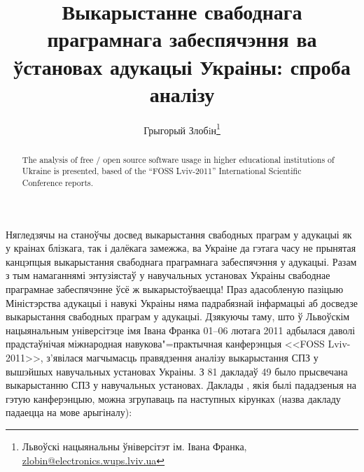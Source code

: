 \documentclass[10pt, a5paper]{article}
\begin{document}
\renewcommand{\figurename}{Рыс.} %
\renewcommand{\abstractname}{Анатацыя}
\renewcommand{\refname}{Літаратура}

\title{Выкарыстанне свабоднага праграмнага забеспячэння ва ўстановах адукацыі Украіны: спроба аналізу}

\author{Грыгорый Злобiн\footnote{Львоўскі нацыянальны ўніверсітэт ім. Івана Франка, \url{zlobin@electronics.wups.lviv.ua}}}
\date{}

\maketitle

\begin{abstract}
The analysis of free / open source software usage in higher educational institutions of Ukraine is presented, based of the ``FOSS Lviv-2011''  International Scientific Conference reports. 
\end{abstract}

Нягледзячы на станоўчы досвед выкарыстання свабодных праграм у адукацыі як у краінах блізкага, так і далёкага замежжа, ва Украіне да гэтага часу не прынятая канцэпцыя выкарыстання свабоднага праграмнага забеспячэння у адукацыі. Разам з тым намаганнямі энтузіястаў у навучальных установах Украіны свабоднае праграмнае забеспячэнне ўсё ж выкарыстоўваецца! Праз адасобленую пазіцыю Міністэрства адукацыі і навукі Украіны няма падрабязнай інфармацыі аб досведзе выкарыстання свабодных праграм у адукацыі. Дзякуючы таму, што ў Львоўскім нацыянальным універсітэце імя Івана Франка 01--06 лютага 2011 адбылася даволі прадстаўнічая міжнародная навукова"=практычная канферэнцыя <<FOSS Lviv-2011>>, з'явілася магчымасць правядзення аналізу выкарыстання СПЗ у вышэйшых навучальных установах Украіны. З 81 дакладаў 49 было прысвечана выкарыстанню СПЗ у навучальных установах. Даклады \cite{fosslviv}, якія былі пададзеныя на гэтую канферэнцыю, можна згрупаваць па наступных кірунках (назва дакладу падаецца на мове арыгіналу):
\end{document}
